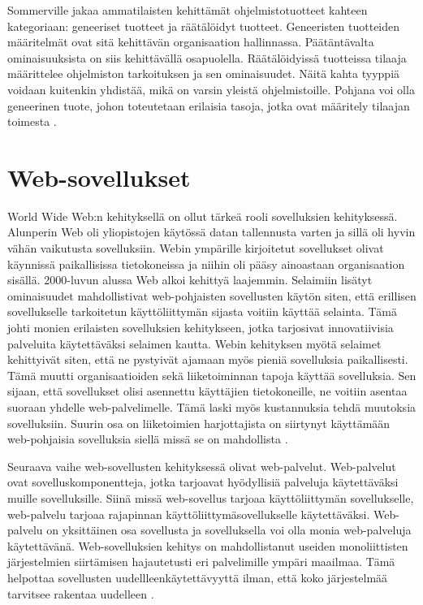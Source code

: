 \documentclass[utf8]{gradu3}
\begin{document}
Sommerville jakaa ammatilaisten kehittämät ohjelmistotuotteet kahteen kategoriaan: geneeriset tuotteet ja räätälöidyt tuotteet. Geneeristen tuotteiden määritelmät ovat sitä kehittävän organisaation hallinnassa. Päätäntävalta ominaisuuksista on siis kehittävällä osapuolella. Räätälöidyissä tuotteissa tilaaja määrittelee ohjelmiston tarkoituksen ja sen ominaisuudet. Näitä kahta tyyppiä voidaan kuitenkin yhdistää, mikä on varsin yleistä ohjelmistoille. Pohjana voi olla geneerinen tuote, johon toteutetaan erilaisia tasoja, jotka ovat määritely tilaajan toimesta \parencite[s.1-10]{Sommerville}.

\section{Web-sovellukset}
World Wide Web:n kehityksellä on ollut tärkeä rooli sovelluksien kehityksessä. Alunperin Web oli yliopistojen käytössä datan tallennusta varten ja sillä oli hyvin vähän vaikutusta sovelluksiin. Webin ympärille kirjoitetut sovellukset olivat käynnissä paikallisissa tietokoneissa ja niihin oli pääsy ainoastaan organisaation sisällä. 2000-luvun alussa Web alkoi kehittyä laajemmin. Selaimiin lisätyt ominaisuudet mahdollistivat web-pohjaisten sovellusten käytön siten, että erillisen sovellukselle tarkoitetun käyttöliittymän sijasta voitiin käyttää selainta. Tämä johti monien erilaisten sovelluksien kehitykseen, jotka tarjosivat innovatiivisia palveluita käytettäväksi selaimen kautta. Webin kehityksen myötä selaimet kehittyivät siten, että ne pystyivät ajamaan myös pieniä sovelluksia paikallisesti. Tämä muutti organisaatioiden sekä liiketoiminnan tapoja käyttää sovelluksia. Sen sijaan, että sovellukset olisi asennettu käyttäjien tietokoneille, ne voitiin asentaa suoraan yhdelle web-palvelimelle. Tämä laski myös kustannuksia tehdä muutoksia sovelluksiin. Suurin osa on liiketoimien harjottajista on siirtynyt käyttämään web-pohjaisia sovelluksia siellä missä se on mahdollista \parencite[s.13]{Sommerville}.

Seuraava vaihe web-sovellusten kehityksessä olivat web-palvelut. Web-palvelut ovat sovelluskomponentteja, jotka tarjoavat hyödyllisiä palveluja käytettäväksi muille sovelluksille. Siinä missä web-sovellus tarjoaa käyttöliittymän sovellukselle, web-palvelu tarjoaa rajapinnan käyttöliittymäsovellukselle käytettäväksi. Web-palvelu on yksittäinen osa sovellusta ja sovelluksella voi olla monia web-palveluja käytettävänä. Web-sovelluksien kehitys on mahdollistanut useiden monoliittisten järjestelmien siirtämisen hajautetusti eri palvelimille ympäri maailmaa. Tämä helpottaa sovellusten uudellleenkäytettävyyttä ilman, että koko järjestelmää tarvitsee rakentaa uudelleen \parencite[s.13]{Sommerville}. 
\end{document}
